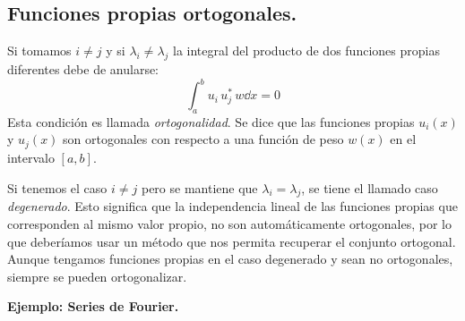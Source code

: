 \subsection{Funciones propias ortogonales.}
Si tomamos $i \neq	j$ y si $\lambda_{i} \neq \lambda_{j}$ la integral del producto de dos funciones propias diferentes debe de anularse:
\begin{equation}
\int_{a}^{b} u_{i} \, u_{j}^{*} \, w \dd{x} = 0
\label{eq:ecuacion_10_36}
\end{equation}
Esta condición es llamada \emph{ortogonalidad}. Se dice que las funciones propias $u_{i}(x)$ y $u_{j}(x)$ son ortogonales con respecto a una función de peso $w(x)$ en el intervalo $[a,b]$.
\par
Si tenemos el caso $i \neq j$ pero se mantiene que $\lambda_{i} = \lambda_{j}$, se tiene el llamado caso \emph{degenerado}. Esto significa que la independencia lineal de las funciones propias que corresponden al mismo valor propio, no son automáticamente ortogonales, por lo que deberíamos usar un método que nos permita recuperar el conjunto ortogonal.  Aunque tengamos funciones propias en el caso degenerado y sean no ortogonales, siempre se pueden ortogonalizar.
\par
\textbf{Ejemplo: Series de Fourier.}

